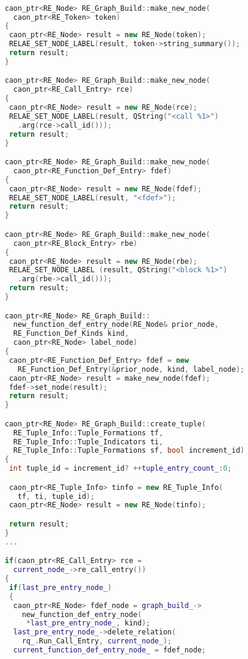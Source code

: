 \tmphs\begin{lstlisting}[caption={%
\emblink{\#lst--initializing-hypernodes--\thelstlisting.pgvm-pdf}{Initializing Hypernodes}},
  language = C++, numbers = none, escapechar = !, 
  label={lst:initializing-hypernodes},
    basicstyle = \ttfamily\bfseries\footnotesize, 
	linewidth = 1.01\linewidth]

caon_ptr<RE_Node> RE_Graph_Build::make_new_node(
  caon_ptr<RE_Token> token)
{
 caon_ptr<RE_Node> result = new RE_Node(token);
 RELAE_SET_NODE_LABEL(result, token->string_summary());
 return result;
}

caon_ptr<RE_Node> RE_Graph_Build::make_new_node(
  caon_ptr<RE_Call_Entry> rce)
{
 caon_ptr<RE_Node> result = new RE_Node(rce);
 RELAE_SET_NODE_LABEL(result, QString("<call %1>")
   .arg(rce->call_id()));
 return result;
}

caon_ptr<RE_Node> RE_Graph_Build::make_new_node(
  caon_ptr<RE_Function_Def_Entry> fdef)
{
 caon_ptr<RE_Node> result = new RE_Node(fdef);
 RELAE_SET_NODE_LABEL(result, "<fdef>");
 return result;
}

caon_ptr<RE_Node> RE_Graph_Build::make_new_node(
  caon_ptr<RE_Block_Entry> rbe)
{
 caon_ptr<RE_Node> result = new RE_Node(rbe);
 RELAE_SET_NODE_LABEL (result, QString("<block %1>")
   .arg(rbe->call_id()));
 return result;
}

caon_ptr<RE_Node> RE_Graph_Build::
  new_function_def_entry_node(RE_Node& prior_node,
  RE_Function_Def_Kinds kind, 
  caon_ptr<RE_Node> label_node)
{
 caon_ptr<RE_Function_Def_Entry> fdef = new 
   RE_Function_Def_Entry(&prior_node, kind, label_node);
 caon_ptr<RE_Node> result = make_new_node(fdef);
 fdef->set_node(result);
 return result;
}

caon_ptr<RE_Node> RE_Graph_Build::create_tuple(
  RE_Tuple_Info::Tuple_Formations tf,
  RE_Tuple_Info::Tuple_Indicators ti, 
  RE_Tuple_Info::Tuple_Formations sf, bool increment_id)
{
 int tuple_id = increment_id? ++tuple_entry_count_:0;

 caon_ptr<RE_Tuple_Info> tinfo = new RE_Tuple_Info(
   tf, ti, tuple_id);
 caon_ptr<RE_Node> result = new RE_Node(tinfo);

 return result;
}
...

if(caon_ptr<RE_Call_Entry> rce = 
  current_node_->re_call_entry())
{
 if(last_pre_entry_node_)
 {
  caon_ptr<RE_Node> fdef_node = graph_build_->
    new_function_def_entry_node(
     *last_pre_entry_node_, kind);
  last_pre_entry_node_->delete_relation(
    rq_.Run_Call_Entry, current_node_);
  current_function_def_entry_node_ = fdef_node;


\end{lstlisting}

